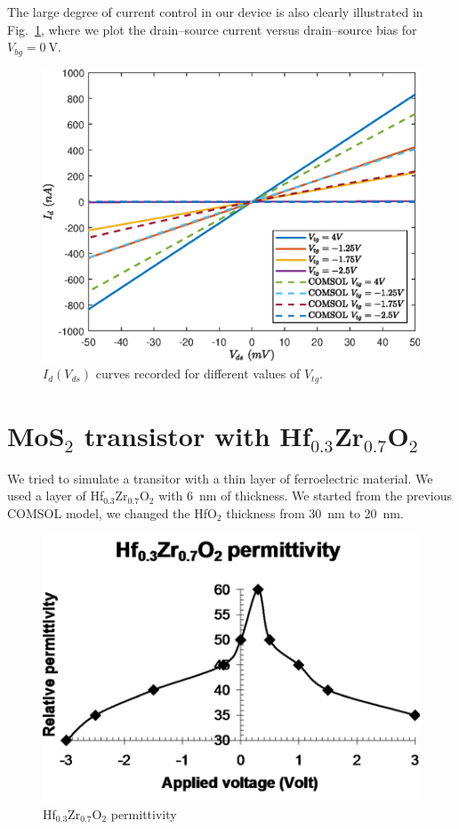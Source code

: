 \documentclass[12pt,a4paper,titlepage]{article}
\begin{document}
The large degree of current control in our device is also clearly illustrated in Fig.~\ref{fig:Id(Vds)_HfO2_MoS2_varying_Vtg}, where we plot the drain–source current versus drain–source bias for $V_{bg}=\SI{0}{\volt}$.

\begin{figure}[H]
	\centering
	\includegraphics[width=.7\textwidth]{Grafici/Id(Vds)_HfO2_MoS2_varying_Vtg.eps} 
	\caption{$I_d(V_{ds})$ curves recorded for different values of $V_{tg}$.}
	\label{fig:Id(Vds)_HfO2_MoS2_varying_Vtg}
\end{figure} 

\newpage
\section{MoS$_2$ transistor with Hf$_{0.3}$Zr$_{0.7}$O$_2$}
We tried to simulate a transitor with a thin layer of ferroelectric material. We used a layer of Hf$_{0.3}$Zr$_{0.7}$O$_2$ with \SI{6}{\nano \meter} of thickness. We started from the previous COMSOL model, we changed the HfO$_2$ thickness from \SI{30}{\nano \meter} to \SI{20}{\nano \meter}.

\begin{figure}[h]
	\centering
	\includegraphics[width=.6\textwidth]{Immagini/HfZrO2_permittivity.png} 
	\caption{Hf$_{0.3}$Zr$_{0.7}$O$_2$ permittivity~\cite{Dragoman:ferroelectric}}
	\label{fig:HfZrO2_permittivity}
\end{figure}
\end{document}
